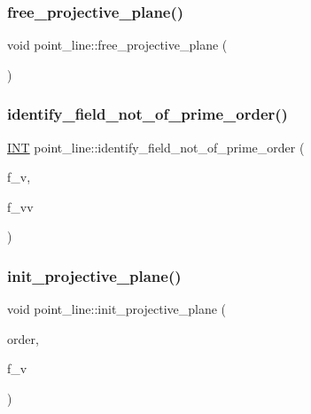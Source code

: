\mbox{\label{classpoint__line_aba056e804e457ed0c563b294169edac6}} 
\subsubsection{\texorpdfstring{free\+\_\+projective\+\_\+plane()}{free\_projective\_plane()}}
{\footnotesize\ttfamily void point\+\_\+line\+::free\+\_\+projective\+\_\+plane (\begin{DoxyParamCaption}{ }\end{DoxyParamCaption})}

\mbox{\label{classpoint__line_aae394019ab60bbb77ee98aaf17c671f4}} 
\subsubsection{\texorpdfstring{identify\+\_\+field\+\_\+not\+\_\+of\+\_\+prime\+\_\+order()}{identify\_field\_not\_of\_prime\_order()}}
{\footnotesize\ttfamily \mbox{\hyperlink{galois_8h_a09fddde158a3a20bd2dcadb609de11dc}{I\+NT}} point\+\_\+line\+::identify\+\_\+field\+\_\+not\+\_\+of\+\_\+prime\+\_\+order (\begin{DoxyParamCaption}\item[{\mbox{\hyperlink{galois_8h_a09fddde158a3a20bd2dcadb609de11dc}{I\+NT}}}]{f\+\_\+v,  }\item[{\mbox{\hyperlink{galois_8h_a09fddde158a3a20bd2dcadb609de11dc}{I\+NT}}}]{f\+\_\+vv }\end{DoxyParamCaption})}

\mbox{\label{classpoint__line_a48c51e9ec6c9a7c80847ecb9feffc03c}} 
\subsubsection{\texorpdfstring{init\+\_\+projective\+\_\+plane()}{init\_projective\_plane()}}
{\footnotesize\ttfamily void point\+\_\+line\+::init\+\_\+projective\+\_\+plane (\begin{DoxyParamCaption}\item[{\mbox{\hyperlink{galois_8h_a09fddde158a3a20bd2dcadb609de11dc}{I\+NT}}}]{order,  }\item[{\mbox{\hyperlink{galois_8h_a09fddde158a3a20bd2dcadb609de11dc}{I\+NT}}}]{f\+\_\+v }\end{DoxyParamCaption})}

